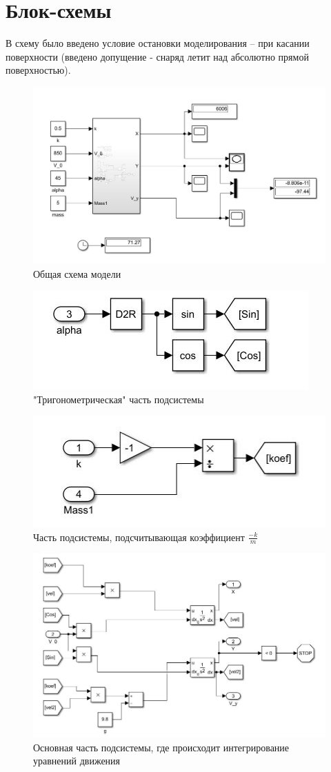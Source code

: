 \documentclass{article}
\begin{document}
	\section{Блок-схемы}
	В схему было введено условие остановки моделирования -- при касании поверхности (введено допущение - снаряд летит над абсолютно прямой поверхностью).
	\begin{figure}[H]
		\centering
		\includegraphics[width=0.7\linewidth]{model1}
		\caption{Общая схема модели}
		\label{fig:model1}
	\end{figure}
	\begin{figure}[H]
		\centering
		\includegraphics[width=0.7\linewidth]{model2}
		\caption{"Тригонометрическая" часть подсистемы}
		\label{fig:model2}
	\end{figure}
	\begin{figure}[H]
		\centering
		\includegraphics[width=0.7\linewidth]{model3}
		\caption{Часть подсистемы, подсчитывающая коэффициент $\frac{-k}{m}$}
		\label{fig:model3}
	\end{figure}
	\begin{figure}[H]
		\centering
		\includegraphics[width=0.7\linewidth]{model4}
		\caption{Основная часть подсистемы, где происходит интегрирование уравнений движения}
		\label{fig:model4}
	\end{figure}
\end{document}
